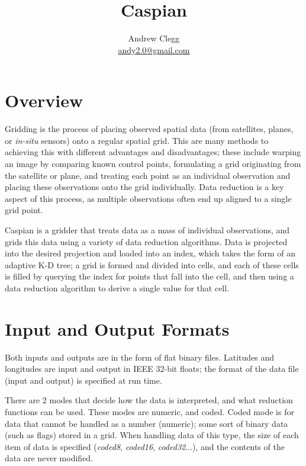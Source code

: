 \documentclass[a4paper,12pt]{article}
\title{Caspian}
\author{Andrew Clegg\\\href{mailto:andy2.0@gmail.com}{andy2.0@gmail.com}}
\begin{document}
\maketitle
{}
\tableofcontents
\section{Overview}
Gridding is the process of placing observed spatial data (from satellites, planes, or \textit{in-situ} sensors) onto a regular spatial grid. This are many methods to achieving this with different advantages and disadvantages; these include warping an image by comparing known control points, formulating a grid originating from the satellite or plane, and treating each point as an individual observation and placing these observations onto the grid individually. Data reduction is a key aspect of this process, as multiple observations often end up aligned to a single grid point.

Caspian is a gridder that treats data as a mass of individual observations, and grids this data using a variety of data reduction algorithms. Data is projected into the desired projection and loaded into an index, which takes the form of an adaptive K-D tree; a grid is formed and divided into cells, and each of these cells is filled by querying the index for points that fall into the cell, and then using a data reduction algorithm to derive a single value for that cell.

\section{Input and Output Formats}
Both inputs and outputs are in the form of flat binary files. Latitudes and longitudes are input and output in IEEE 32-bit floats; the format of the data file (input and output) is specified at run time.

There are 2 modes that decide how the data is interpreted, and what reduction functions can be used. These modes are numeric, and coded. Coded mode is for data that cannot be handled as a number (numeric); some sort of binary data (such as flags) stored in a grid. When handling data of this type, the size of each item of data is specified (\textit{coded8}, \textit{coded16}, \textit{coded32}...), and the contents of the data are never modified.
\end{document}
